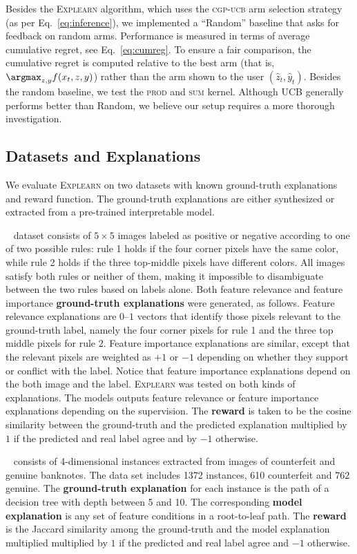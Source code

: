 \documentclass[letterpaper]{article} %
\newcommand{\explearn}{\textsc{Explearn}\xspace}
\newcommand{\cgpucb}{\textsc{cgp-ucb}\xspace}
\begin{document}
 Besides the \explearn algorithm, which uses the \cgpucb arm selection strategy (as per Eq.~\ref{eq:inference}), we implemented a ``Random'' baseline that asks for feedback on random arms.  Performance is measured in terms of average cumulative regret, see Eq.~\ref{eq:cumreg}.  To ensure a fair comparison, the cumulative regret is computed relative to the best arm (that is, $\argmax_{z,y} f(x_t, z, y)$) rather than the arm shown to the user $(\hat{z}_t, \hat{y}_t)$.  Besides the random baseline, we test the \textsc{prod} and \textsc{sum} kernel. Although UCB generally performs better than Random, we believe our setup requires a more thorough investigation.


\subsection{Datasets and Explanations} 

We evaluate \explearn on two datasets with known ground-truth explanations and reward function. The ground-truth explanations are either synthesized or extracted from a pre-trained interpretable model.

~\cite{ross2017right} dataset consists of $5{\times}5$ images labeled as positive or negative according to one of two possible rules:  rule 1 holds if the four corner pixels have the same color, while rule 2 holds if the three top-middle pixels have different colors.  All images satisfy both rules or neither of them, making it impossible to disambiguate between the two rules based on labels alone.  Both feature relevance and feature importance \textbf{ground-truth explanations} were generated, as follows.  Feature relevance explanations are $0$--$1$ vectors that identify those pixels relevant to the ground-truth label, namely the four corner pixels for rule 1 and the three top middle pixels for rule 2.  Feature importance explanations are similar, except that the relevant pixels are weighted as $+1$ or $-1$ depending on whether they support or conflict with the label.  Notice that feature importance explanations depend on the both image and the label.  \explearn was tested on both kinds of explanations.  The models outputs feature relevance or feature importance explanations depending on the supervision.  The \textbf{reward} is taken to be the cosine similarity between the ground-truth and the predicted explanation multiplied by $1$ if the predicted and real label agree and by $-1$ otherwise.

~\cite{dua2019uci} consists of 4-dimensional instances extracted from images of counterfeit and genuine banknotes.  The data set includes 1372 instances, 610 counterfeit and 762 genuine. The \textbf{ground-truth explanation} for each instance is the path of a decision tree with depth between 5 and 10. The corresponding \textbf{model explanation} is any set of feature conditions in a root-to-leaf path.  The \textbf{reward} is the Jaccard similarity among the ground-truth and the model explanation multiplied multiplied by $1$ if the predicted and real label agree and $-1$ otherwise.
\end{document}
